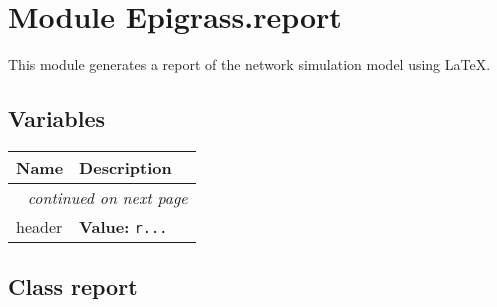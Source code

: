 %
%
%


\section{Module Epigrass.report}

    \label{Epigrass:report}
This module generates a report of the network simulation model using LaTeX.



  \subsection{Variables}

\begin{longtable}{|p{}|p{}|l}
\cline{1-2}
\cline{1-2} \centering \textbf{Name} & \centering \textbf{Description}& \\
\cline{1-2}
\endhead\cline{1-2}\multicolumn{3}{r}{\small\textit{continued on next page}}\\\endfoot\cline{1-2}
\endlastfoot\raggedright h\-e\-a\-d\-e\-r\- & \raggedright \textbf{Value:} 
{\tt r\texttt{...}}&\\
\cline{1-2}
\end{longtable}



\subsection{Class report}

